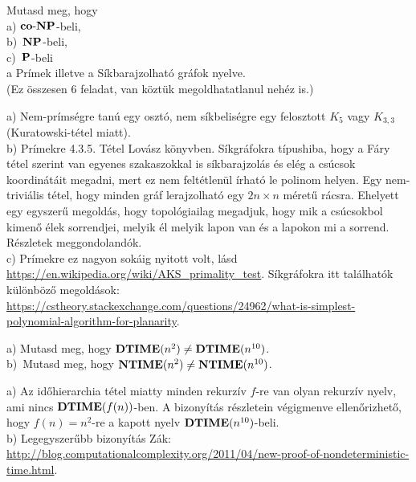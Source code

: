 \begin{Exercise}[counter={sorszam}, difficulty=0]
	Mutasd meg, hogy\\
	a) $\coNP$-beli,\\
	b)~\hard $\NP$-beli,\\
	c)~\veryhard $\P$-beli\\
	a Pr\'imek illetve a S\'ikbarajzolhat\'o gr\'afok nyelve.\\
	(Ez \"osszesen 6 feladat, van k\"ozt\"uk megoldhatatlanul neh\'ez is.)
\end{Exercise}	
\begin{Answer}
	a) Nem-pr\'ims\'egre tan\'u egy oszt\'o, nem s\'ikbelis\'egre egy felosztott $K_5$ vagy $K_{3,3}$ (Kuratowski-t\'etel miatt).\\
	b) Pr\'imekre 4.3.5. Tétel Lov\'asz k\"onyvben. S\'ikgr\'afokra t\'ipushiba, hogy a F\'ary t\'etel szerint van egyenes szakaszokkal is s\'ikbarajzol\'as \'es el\'eg a cs\'ucsok koordin\'at\'ait megadni, mert ez nem felt\'etlen\"ul \'irhat\'o le polinom helyen. Egy nem-trivi\'alis t\'etel, hogy minden gr\'af lerajzolhat\'o egy $2n\times n$ m\'eret\H u r\'acsra. Ehelyett egy egyszer\H u megold\'as, hogy topol\'ogiailag megadjuk, hogy mik a cs\'ucsokbol kimen\H o \'elek sorrendjei, melyik \'el melyik lapon van \'es a lapokon mi a sorrend. R\'eszletek meggondoland\'ok.\\
	c) Pr\'imekre ez nagyon sok\'aig nyitott volt, l\'asd \url{https://en.wikipedia.org/wiki/AKS_primality_test}. S\'ikgr\'afokra itt tal\'alhat\'ok k\"ul\"onb\"oz\H o megold\'asok: \url{https://cstheory.stackexchange.com/questions/24962/what-is-simplest-polynomial-algorithm-for-planarity}.
\end{Answer}



\begin{Exercise}[counter={sorszam}, difficulty=0]
	a) Mutasd meg, hogy $\DTIME(n^2)\ne\DTIME(n^{10})$.\\
	b)~\veryhard Mutasd meg, hogy $\NTIME(n^2)\ne\NTIME(n^{10})$.
\end{Exercise}	
\begin{Answer}
	a) Az id\H ohierarchia t\'etel miatty minden rekurz\'iv $f$-re van olyan rekurz\'iv nyelv, ami nincs $\DTIME(f(n))$-ben. A bizony\'it\'as r\'eszletein v\'egigmenve ellen\H orizhet\H o, hogy $f(n)=n^2$-re a kapott nyelv $\DTIME(n^{10})$-beli.\\
	b) Legegyszer\H ubb bizony\'it\'as Z\'ak: \url{http://blog.computationalcomplexity.org/2011/04/new-proof-of-nondeterministic-time.html}.
\end{Answer}



